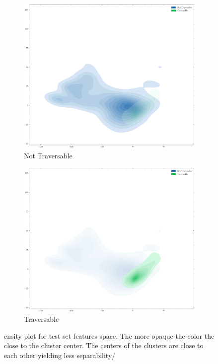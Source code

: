 \documentclass[../document.tex]{subfiles}
\begin{document}
\begin{figure} [htbp]
\begin{subfigure}[b]{0.48\textwidth}
    \includegraphics[width=\linewidth]{../img/5/pca/pca-test-0-density.png}
    \caption{Not Traversable}
\end{subfigure}
\begin{subfigure}[b]{0.48\textwidth}
    \includegraphics[width=\linewidth]{../img/5/pca/pca-test-1-density.png}
    \caption{Traversable}
    \label{fig : pca-test-density-1}
\end{subfigure}
\caption{ensity plot for test set features space. The more opaque the color the close to the cluster center. The centers of the clusters are close to each other yielding less separability/}
\end{figure}
\end{document}
